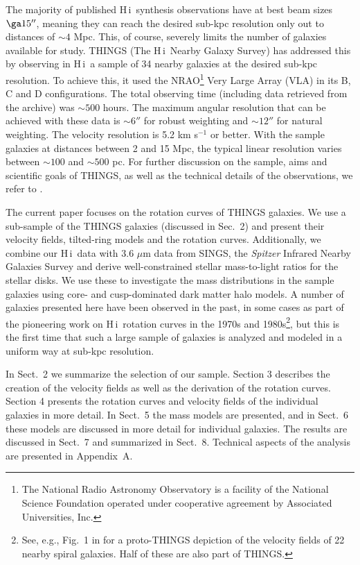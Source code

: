 \documentclass[usenatbib,usegraphicx,apjfonts,floatfix]{emulateapj}
\newcommand{\HI}{H\,{\sc i}}
\begin{document}
The majority of published \HI\ synthesis observations have at best beam sizes
$\ga 15''$, meaning they can reach the desired sub-kpc resolution only
out to distances of $\sim 4$ Mpc.  This, of course, severely limits
the number of galaxies available for study.  THINGS (The \HI\ 
Nearby Galaxy Survey) has addressed this by observing in \HI\ a sample
of 34 nearby galaxies at the desired sub-kpc resolution. To achieve
this, it used the NRAO\footnote{The National Radio Astronomy
  Observatory is a facility of the National Science Foundation
  operated under cooperative agreement by Associated Universities,
  Inc.}  Very Large Array (VLA) in its B, C and D configurations.  The
total observing time (including data retrieved from the archive) was
$\sim 500$ hours.  The maximum angular resolution that can be achieved
with these data is $\sim 6''$ for robust weighting and $\sim 12''$ for
natural weighting. The velocity resolution is 5.2 km s$^{-1}$ or
better. With the sample galaxies at distances between 2 and 15 Mpc,
the typical linear resolution varies between $\sim 100$ and $\sim 500$
pc.  For further discussion on the sample, aims and scientific goals
of THINGS, as well as the technical details of the observations, we
refer to \citet{THINGS1}.

The current paper focuses on the rotation curves of THINGS galaxies.
We use a sub-sample of the THINGS galaxies (discussed in Sec.~2) and
present their velocity fields, tilted-ring models and the rotation
curves. Additionally, we combine our \HI\ data with 3.6 $\mu$m data
from SINGS, the \emph{Spitzer} Infrared Nearby Galaxies Survey
\citep{sings} and derive well-constrained stellar mass-to-light ratios
for the stellar disks.  We use these to investigate the mass
distributions in the sample galaxies using core- and cusp-dominated
dark matter halo models.  A number of galaxies presented here have
been observed in the past, in some cases as part of the pioneering
work on \HI\ rotation curves in the 1970s and 1980s\footnote{See,
  e.g., Fig.~1 in \citet{bosma81} for a proto-THINGS depiction of the
  velocity fields of 22 nearby spiral galaxies. Half of these are also
  part of THINGS.}, but this is the first time that such a large
sample of galaxies is analyzed and modeled in a uniform way at sub-kpc
resolution.

In Sect.\ 2 we summarize the selection of our sample. Section 3
describes the creation of the velocity fields as well as the
derivation of the rotation curves. Section 4 presents the rotation
curves and velocity fields of the individual galaxies in more
detail. In Sect.\ 5 the mass models are presented, and in Sect.\ 6
these models are discussed in more detail for individual galaxies. The
results are discussed in Sect.\ 7 and summarized in
Sect.\ 8. Technical aspects of the analysis are presented in
Appendix~A.
\end{document}
